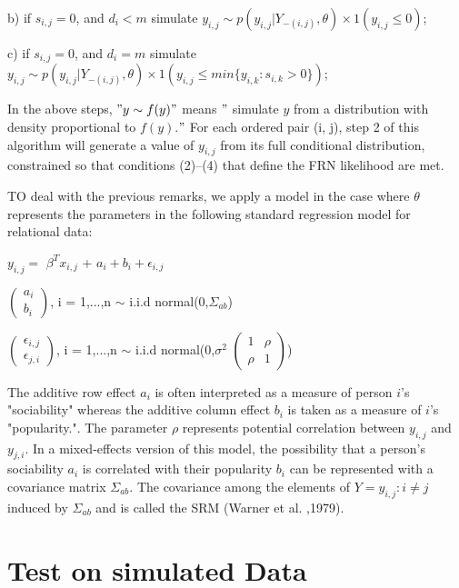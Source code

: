 \documentclass[12pt]{ociamthesis}  %
\begin{document}
	b)  if $s_{i,j} = 0$, and $d_{i} < m$ simulate $y_{i,j} \sim p(y_{i,j}| Y_{-(i,j)}, \theta) \times 1(y_{i,j} \leq 0)$;
	
	c) if $s_{i,j} = 0$, and $d_{i} = m$ simulate $y_{i,j} \sim p(y_{i,j}| Y_{-(i,j)}, \theta) \times 1(y_{i,j} \leq min \{ y_{i,k} : s_{i,k} > 0 \})$;
	
	In the above steps, $"y \sim f(y)"$ means $"$ simulate $y$ from a distribution with density proportional
	to $f(y)$.$ " $ For each ordered pair (i, j), step 2 of this algorithm will generate a value of $y_{i,j}$ from
	its full conditional distribution, constrained so that conditions (2)–(4) that define the FRN likelihood are met.
	
	TO deal with the previous remarks, we apply a model in the case where $\theta$  represents the parameters in the following standard regression model for relational data:
	
	$y_{i,j} = $ \boldmath $\beta^{T} {x_{i,j}}$ \unboldmath + $a_{i} + b_{i} + \epsilon_{i,j}$
	
	\(
	\begin{pmatrix}
	a_{i} \\
	b_{i}
	\end{pmatrix}
	\), i = 1,...,n $\sim $ i.i.d normal(0,$\Sigma_{ab}$)
	
	\(
	\begin{pmatrix}
	\epsilon_{i,j} \\
	\epsilon_{j,i}
	\end{pmatrix}
	\), i = 1,...,n $\sim $ i.i.d normal(0,$\sigma^{2}$ $\begin{pmatrix} 1 & \rho \\ \rho & 1 \end{pmatrix}$)
	
	The additive row effect $a_{i}$ is often interpreted as a measure of person $i$’s "sociability" whereas the additive column effect $b_{i}$ is taken as a measure of $i$’s "popularity.". The parameter $\rho$ represents potential correlation between $y_{i,j} $ and $y_{j,i}$. In a mixed-effects version
	of this model, the possibility that a person’s sociability $a_{i}$ is correlated with their popularity $b_{i}$ can be represented with a covariance matrix $\Sigma_{ab}$. The covariance among the elements of $Y = {y_{i,j} : i \neq j}$ induced by $\Sigma_{ab}$ and is called the SRM (Warner et al. ,1979).
	\chapter{Test on simulated Data}
	
\end{document}
